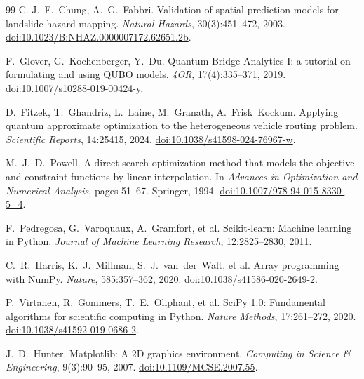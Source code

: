 \documentclass[11pt,a4paper]{article}
\begin{document}
\begin{thebibliography}{99}
C.-J.~F.~Chung, A.~G.~Fabbri.
Validation of spatial prediction models for landslide hazard mapping.
\emph{Natural Hazards}, 30(3):451--472, 2003.
\href{https://doi.org/10.1023/B:NHAZ.0000007172.62651.2b}{doi:10.1023/B:NHAZ.0000007172.62651.2b}.

F.~Glover, G.~Kochenberger, Y.~Du.
Quantum Bridge Analytics I: a tutorial on formulating and using QUBO models.
\emph{4OR}, 17(4):335--371, 2019.
\href{https://doi.org/10.1007/s10288-019-00424-y}{doi:10.1007/s10288-019-00424-y}.

D.~Fitzek, T.~Ghandriz, L.~Laine, M.~Granath, A.~Frisk~Kockum.
Applying quantum approximate optimization to the heterogeneous vehicle routing
problem.
\emph{Scientific Reports}, 14:25415, 2024.
\href{https://doi.org/10.1038/s41598-024-76967-w}{doi:10.1038/s41598-024-76967-w}.

M.~J.~D.~Powell.
A direct search optimization method that models the objective and constraint
functions by linear interpolation.
In \emph{Advances in Optimization and Numerical Analysis}, pages 51--67.
Springer, 1994.
\href{https://doi.org/10.1007/978-94-015-8330-5_4}{doi:10.1007/978-94-015-8330-5\_4}.

F.~Pedregosa, G.~Varoquaux, A.~Gramfort, et al.
Scikit-learn: Machine learning in Python.
\emph{Journal of Machine Learning Research}, 12:2825--2830, 2011.

C.~R.~Harris, K.~J.~Millman, S.~J.~van~der~Walt, et al.
Array programming with NumPy.
\emph{Nature}, 585:357--362, 2020.
\href{https://doi.org/10.1038/s41586-020-2649-2}{doi:10.1038/s41586-020-2649-2}.

P.~Virtanen, R.~Gommers, T.~E.~Oliphant, et al.
SciPy 1.0: Fundamental algorithms for scientific computing in Python.
\emph{Nature Methods}, 17:261--272, 2020.
\href{https://doi.org/10.1038/s41592-019-0686-2}{doi:10.1038/s41592-019-0686-2}.

J.~D.~Hunter.
Matplotlib: A 2D graphics environment.
\emph{Computing in Science \& Engineering}, 9(3):90--95, 2007.
\href{https://doi.org/10.1109/MCSE.2007.55}{doi:10.1109/MCSE.2007.55}.

\end{thebibliography}
\end{document}
